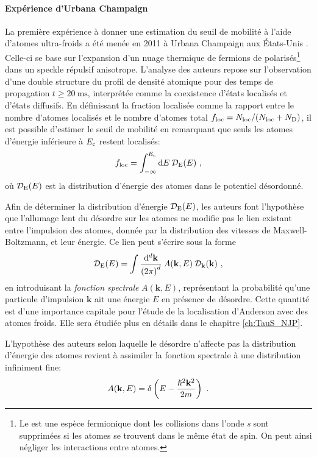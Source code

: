 \paragraph*{Expérience d'Urbana Champaign}
La première expérience à donner une estimation du seuil de mobilité à l'aide d'atomes ultra-froids a été menée en 2011 à Urbana Champaign aux États-Unis \citep{kondov2011three}. Celle-ci se base sur l'expansion d'un nuage thermique de fermions de  polarisés\footnote{Le  est une espèce fermionique dont les collisions dans l'onde \textit{s} sont supprimées si les atomes se trouvent dans le même état de spin. On peut ainsi négliger les interactions entre atomes.} dans un speckle répulsif anisotrope. L'analyse des auteurs repose sur l'observation d'une double structure du profil de densité atomique pour des temps de propagation $t\geq \SI{20}{\milli\second}$, interprétée comme la coexistence d'états localisés et d'états diffusifs. En définissant la fraction localisée comme la rapport entre le nombre d'atomes localisés et le nombre d'atomes total $f_{\mathrm{loc}}=N_{\mathrm{loc}}/(N_{\mathrm{loc}}+N_{\mathrm{D}})$, il est possible d'estimer le seuil de mobilité en remarquant que seuls les atomes d'énergie inférieure à $E_{\mathrm{c}}$ restent localisés:
\begin{equation}
f_{\mathrm{loc}}=\int_{-\infty}^{E_{\mathrm{c}}}{\mathop{}\mathopen{}\mathrm{d} E \: \mathcal{D}_{\mathrm{E}}(E)} \text{ ,}
\label{eq:fraction_localisee}
\end{equation}
où $\mathcal{D}_{\mathrm{E}}(E)$ est la distribution d'énergie des atomes dans le potentiel désordonné.

Afin de déterminer la distribution d'énergie $\mathcal{D}_{\mathrm{E}}(E)$, les auteurs font l'hypothèse que l'allumage lent du désordre sur les atomes ne modifie pas le lien existant entre l'impulsion des atomes, donnée par la distribution des vitesses de Maxwell-Boltzmann, et leur énergie. Ce lien peut s'écrire sous la forme
\begin{equation}
\mathcal{D}_{\mathrm{E}}(E)= \int{\frac{\mathrm{d}^d \mathbf{k}}{{(2 \pi)}^d} \: A(\mathbf{k},E) \: \mathcal{D}_{\mathbf{k}}(\mathbf{k})} \text{ ,}
\label{eq:fonction_spectrale}
\end{equation}
en introduisant la \emph{fonction spectrale} $A(\mathbf{k},E)$, représentant la probabilité qu'une particule d'impulsion $\mathbf{k}$ ait une énergie $E$ en présence de désordre. Cette quantité est d'une importance capitale pour l'étude de la localisation d'Anderson avec des atomes froids. Elle sera étudiée plus en détails dans le chapitre \ref{ch:TauS_NJP}.

L'hypothèse des auteurs selon laquelle le désordre n'affecte pas la distribution d'énergie des atomes revient à assimiler la fonction spectrale à une distribution infiniment fine:
\begin{equation}
A(\mathbf{k},E) = \delta\left(E- \frac{\hslash^2 \mathbf{k}^2}{2m}\right) \text{ .}
\label{eq:hypothese_urbana_champaign}
\end{equation}

